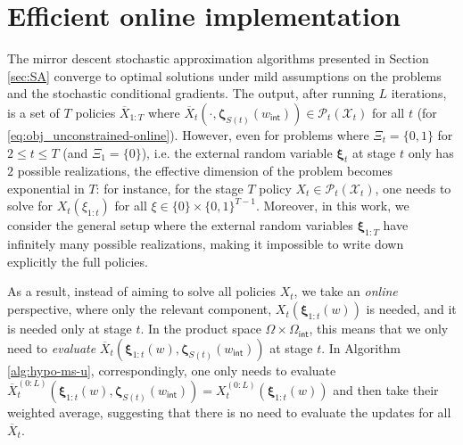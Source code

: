 \documentclass[11pt,fullpage,letterpaper]{article}
\newcommand{\mc}{\mathcal}
\newcommand{\bx}{\boldsymbol{\xi}}
\newcommand{\bz}{\boldsymbol{\zeta}}
\newcommand{\internal}{\mathsf{int}}
\begin{document}



\section{Efficient online implementation}\label{sec:online-implementation}


The mirror descent stochastic approximation algorithms presented in Section \ref{sec:SA} converge to optimal solutions under mild assumptions on the problems and the stochastic conditional gradients. The output, after running $L$ iterations, is a set of $T$ policies $\overline{X}_{1:T}$ where $\overline{X}_t(\cdot,\bz_{S(t)}(w_{\internal}))\in \mc P_t(\mc X_t)$ for all $t$ (for \eqref{eq:obj_unconstrained-online}). However, even for problems where $\Xi_t = \{0,1\}$ for $2\leq t\leq T$ (and $\Xi_1 = \{0\}$), i.e. the external random variable $\bx_t$ at stage $t$ only has $2$ possible realizations, the effective dimension of the problem becomes exponential in $T$: for instance, for the stage $T$ policy $X_t\in \mc P_t(\mc X_t)$, one needs to solve for $X_t(\xi_{1:t})$ for all $\xi\in\{0\}\times \{0,1\}^{T-1}$. Moreover, in this work, we consider the general setup where the external random variables $\bx_{1:T}$ have infinitely many possible realizations, making it impossible to write down explicitly the full policies.

As a result, instead of aiming to solve all policies $X_t$, we take an \textit{online} perspective, where only the relevant component, $X_t(\bx_{1:t}(w))$ is needed, and it is needed only at stage $t$. In the product space $\Omega\times \Omega_{\internal}$, this means that we only need to \textit{evaluate} $\overline{X}_t(\bx_{1:t}(w),\bz_{S(t)}(w_{\internal}))$ at stage $t$. In Algorithm \ref{alg:hypo-ms-u}, correspondingly, one only needs to evaluate $\overline{X}^{(0:L)}_t(\bx_{1:t}(w),\bz_{S(t)}(w_{\internal})) = X^{(0:L)}_t(\bx_{1:t}(w))$ and then take their weighted average, suggesting that there is no need to evaluate the updates for all $\overline{X}_t$.  
\end{document}
